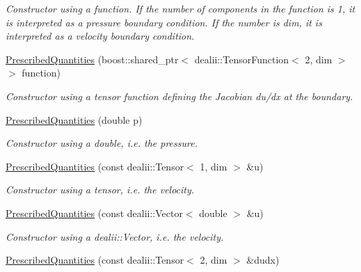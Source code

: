 \begin{DoxyCompactItemize}
\begin{DoxyCompactList}\small\item\em Constructor using a function. If the number of components in the function is 1, it is interpreted as a pressure boundary condition. If the number is dim, it is interpreted as a velocity boundary condition. \item\end{DoxyCompactList}\item 
\hypertarget{classnatrium_1_1PrescribedQuantities_a1984ed6cdad355564ec03ee27df6c00e}{
\hyperlink{classnatrium_1_1PrescribedQuantities_a1984ed6cdad355564ec03ee27df6c00e}{PrescribedQuantities} (boost::shared\_\-ptr$<$ dealii::TensorFunction$<$ 2, dim $>$ $>$ function)}
\label{classnatrium_1_1PrescribedQuantities_a1984ed6cdad355564ec03ee27df6c00e}

\begin{DoxyCompactList}\small\item\em Constructor using a tensor function defining the Jacobian du/dx at the boundary. \item\end{DoxyCompactList}\item 
\hyperlink{classnatrium_1_1PrescribedQuantities_abac8488a975cb98a6412adb903ad66ab}{PrescribedQuantities} (double p)
\begin{DoxyCompactList}\small\item\em Constructor using a double, i.e. the pressure. \item\end{DoxyCompactList}\item 
\hyperlink{classnatrium_1_1PrescribedQuantities_a277c4dcfb5cdfa4f14164df1ca0b01f8}{PrescribedQuantities} (const dealii::Tensor$<$ 1, dim $>$ \&u)
\begin{DoxyCompactList}\small\item\em Constructor using a tensor, i.e. the velocity. \item\end{DoxyCompactList}\item 
\hyperlink{classnatrium_1_1PrescribedQuantities_af56b9d9bcfb6b49e8163600d62779ef3}{PrescribedQuantities} (const dealii::Vector$<$ double $>$ \&u)
\begin{DoxyCompactList}\small\item\em Constructor using a dealii::Vector, i.e. the velocity. \item\end{DoxyCompactList}\item 
\hyperlink{classnatrium_1_1PrescribedQuantities_a3c4ac1b172d9bcd2f365a8b2c258e001}{PrescribedQuantities} (const dealii::Tensor$<$ 2, dim $>$ \&dudx)

\end{DoxyCompactItemize}
